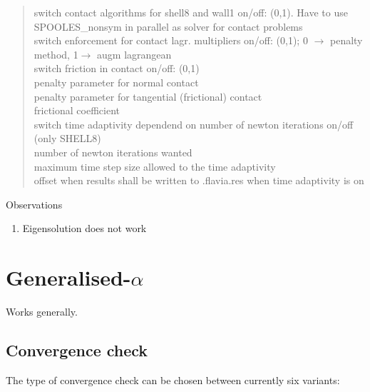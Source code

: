 \begin{quote}
 \chs switch contact algorithms for
shell8 and wall1 on/off: (0,1). Have to use SPOOLES\_nonsym in parallel as
solver for contact problems \\
 \chs switch enforcement for contact
lagr. multipliers on/off: (0,1); 0 $\to$ penalty method, 1$\to$ augm
lagrangean \\
 \chs switch friction in contact on/off: (0,1) \\
 \chs penalty parameter for normal contact \\
 \chs penalty parameter for tangential (frictional) contact \\
 \chs frictional coefficient \\
 \chs switch time adaptivity dependend on
number of newton iterations on/off (only SHELL8) \\
 \chs number of newton iterations wanted \\
 \chs maximum time step size allowed to the time adaptivity
\\
 \chs offset when results shall be written to .flavia.res when time adaptivity is on
\end{quote}

Observations
\begin{enumerate}
\item Eigensolution does not work
\end{enumerate}
\section{Generalised-$\alpha$}

Works generally.

\subsection{Convergence check}

The type of convergence check can be chosen between currently six variants:

